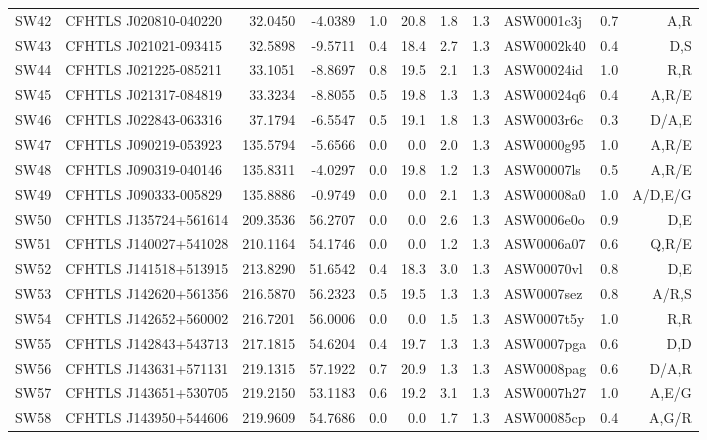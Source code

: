 \documentclass[useAMS,usenatbib,a4paper]{mn2e}
\begin{document}
\begin{center}
\begin{longtable}{llrrrrrrlrr}
SW42 & CFHTLS J020810-040220 &   32.0450 &   -4.0389 &  1.0 & 20.8 &  1.8 &  1.3 & ASW0001c3j &  0.7  &  A,R   \\
SW43 & CFHTLS J021021-093415 &   32.5898 &   -9.5711 &  0.4 & 18.4 &  2.7 &  1.3 & ASW0002k40 &  0.4  &  D,S   \\
SW44 & CFHTLS J021225-085211 &   33.1051 &   -8.8697 &  0.8 & 19.5 &  2.1 &  1.3 & ASW00024id &  1.0  &  R,R   \\
SW45 & CFHTLS J021317-084819 &   33.3234 &   -8.8055 &  0.5 & 19.8 &  1.3 &  1.3 & ASW00024q6 &  0.4  &  A,R/E   \\
SW46 & CFHTLS J022843-063316 &   37.1794 &   -6.5547 &  0.5 & 19.1 &  1.8 &  1.3 & ASW0003r6c &  0.3  &  D/A,E   \\
SW47 & CFHTLS J090219-053923 &  135.5794 &   -5.6566 &  0.0 &  0.0 &  2.0 &  1.3 & ASW0000g95 &  1.0  &  A,R/E   \\
SW48 & CFHTLS J090319-040146 &  135.8311 &   -4.0297 &  0.0 & 19.8 &  1.2 &  1.3 & ASW00007ls &  0.5  &  A,R/E   \\
SW49 & CFHTLS J090333-005829 &  135.8886 &   -0.9749 &  0.0 &  0.0 &  2.1 &  1.3 & ASW00008a0 &  1.0  &  A/D,E/G   \\
SW50 & CFHTLS J135724+561614 &  209.3536 &   56.2707 &  0.0 &  0.0 &  2.6 &  1.3 & ASW0006e0o &  0.9  &  D,E   \\
SW51 & CFHTLS J140027+541028 &  210.1164 &   54.1746 &  0.0 &  0.0 &  1.2 &  1.3 & ASW0006a07 &  0.6  &  Q,R/E   \\
SW52 & CFHTLS J141518+513915 &  213.8290 &   51.6542 &  0.4 & 18.3 &  3.0 &  1.3 & ASW00070vl &  0.8  &  D,E   \\
SW53 & CFHTLS J142620+561356 &  216.5870 &   56.2323 &  0.5 & 19.5 &  1.3 &  1.3 & ASW0007sez &  0.8  &  A/R,S   \\
SW54 & CFHTLS J142652+560002 &  216.7201 &   56.0006 &  0.0 &  0.0 &  1.5 &  1.3 & ASW0007t5y &  1.0  &  R,R   \\
SW55 & CFHTLS J142843+543713 &  217.1815 &   54.6204 &  0.4 & 19.7 &  1.3 &  1.3 & ASW0007pga &  0.6  &  D,D   \\
SW56 & CFHTLS J143631+571131 &  219.1315 &   57.1922 &  0.7 & 20.9 &  1.3 &  1.3 & ASW0008pag &  0.6  &  D/A,R   \\
SW57 & CFHTLS J143651+530705 &  219.2150 &   53.1183 &  0.6 & 19.2 &  3.1 &  1.3 & ASW0007h27 &  1.0  &  A,E/G   \\
SW58 & CFHTLS J143950+544606 &  219.9609 &   54.7686 &  0.0 &  0.0 &  1.7 &  1.3 & ASW00085cp &  0.4  &  A,G/R   \\

\end{longtable}
\end{center}
\end{document}
